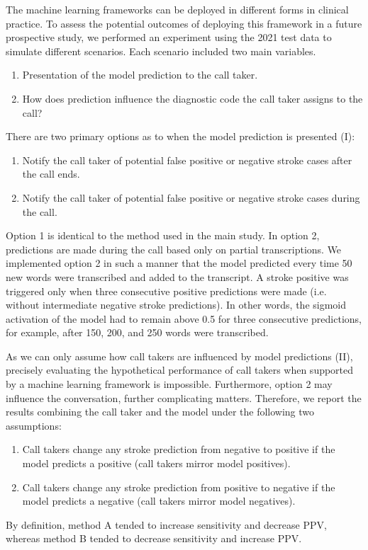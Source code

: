 {The machine learning frameworks can be deployed in different forms in clinical practice. To assess the potential outcomes of deploying this framework in a future prospective study, we performed an experiment using the 2021 test data to simulate different scenarios. Each scenario included two main variables.
%
\begin{enumerate}[label=\Roman*.]
    \item Presentation of the model prediction to the call taker.
    \item How does prediction influence the diagnostic code the call taker assigns to the call?
\end{enumerate}
%
There are two primary options as to when the model prediction is presented (I):
%
\begin{enumerate}
    \item Notify the call taker of potential false positive or negative stroke cases after the call ends.
    \item Notify the call taker of potential false positive or negative stroke cases during the call.
\end{enumerate}
%
Option 1 is identical to the method used in the main study. In option 2, predictions are made during the call based only on partial transcriptions. We implemented option 2 in such a manner that the model predicted every time 50 new words were transcribed and added to the transcript. A stroke positive was triggered only when three consecutive positive predictions were made (i.e. without intermediate negative stroke predictions). In other words, the sigmoid activation of the model had to remain above 0.5 for three consecutive predictions, for example, after 150, 200, and 250 words were transcribed.

As we can only assume how call takers are influenced by model predictions (II), precisely evaluating the hypothetical performance of call takers when supported by a machine learning framework is impossible. Furthermore, option 2 may influence the conversation, further complicating matters. Therefore, we report the results combining the call taker and the model under the following two assumptions:
%
\begin{enumerate}[label=\Alph*.]
    \item Call takers change any stroke prediction from negative to positive if the model predicts a positive (call takers mirror model positives).
    \item Call takers change any stroke prediction from positive to negative if the model predicts a negative (call takers mirror model negatives).
\end{enumerate}
%
By definition, method A tended to increase sensitivity and decrease PPV, whereas method B tended to decrease sensitivity and increase PPV.

}
